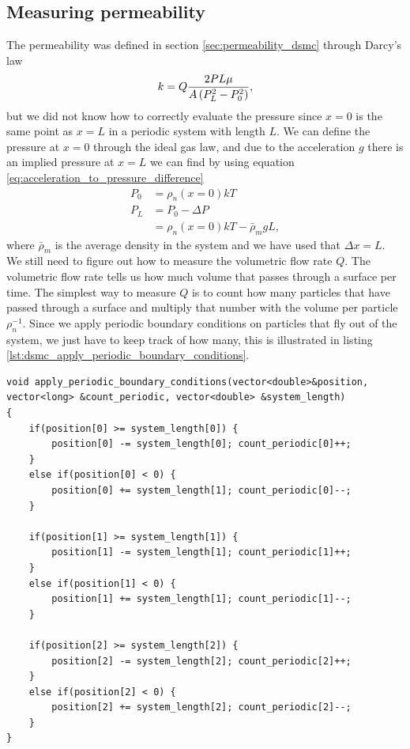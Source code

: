 \subsection{Measuring permeability}
\label{sec:permeability_acceleration_driven}
The permeability was defined in section \ref{sec:permeability_dsmc} through Darcy's law
\begin{align}
	k = Q{2PL\mu\over A\left(P_L^2 - P_0^2\right)},
\end{align}
but we did not know how to correctly evaluate the pressure since $x=0$ is the same point as $x=L$ in a periodic system with length $L$. We can define the pressure at $x=0$ through the ideal gas law, and due to the acceleration $g$ there is an implied pressure at $x=L$ we can find by using equation \eqref{eq:acceleration_to_pressure_difference}
\begin{align}
	P_0 &= \rho_n(x=0)kT\\
	P_L &= P_0 - \Delta P \\
	&= \rho_n(x=0)kT - \bar{\rho}_m g L,
\end{align}
where $\bar{\rho}_m$ is the average density in the system and we have used that $\Delta x=L$.\\
We still need to figure out how to measure the volumetric flow rate $Q$. The volumetric flow rate tells us how much volume that passes through a surface per time. The simplest way to measure $Q$ is to count how many particles that have passed through a surface and multiply that number with the volume per particle $\rho_n^{-1}$. Since we apply periodic boundary conditions on particles that fly out of the system, we just have to keep track of how many, this is illustrated in listing \ref{lst:dsmc_apply_periodic_boundary_conditions}.
\begin{lstlisting}[caption=Example of how to apply periodic boundary conditions and at the same time calculate number flux., label=lst:dsmc_apply_periodic_boundary_conditions]
void apply_periodic_boundary_conditions(vector<double>&position, vector<long> &count_periodic, vector<double> &system_length)
{
    if(position[0] >= system_length[0]) { 
    	position[0] -= system_length[0]; count_periodic[0]++; 
    }
    else if(position[0] < 0) { 
    	position[0] += system_length[1]; count_periodic[0]--; 
    }

    if(position[1] >= system_length[1]) { 
    	position[1] -= system_length[1]; count_periodic[1]++;
    }
    else if(position[1] < 0) {
    	position[1] += system_length[1]; count_periodic[1]--; 
    }

    if(position[2] >= system_length[2]) { 
    	position[2] -= system_length[2]; count_periodic[2]++; 
    }
    else if(position[2] < 0) {
    	position[2] += system_length[2]; count_periodic[2]--; 
    }
}
\end{lstlisting}
